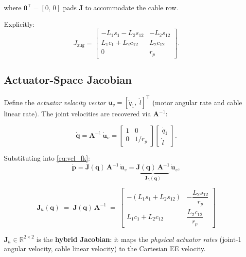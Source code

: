 \documentclass[12pt, a4paper]{article}
\theoremstyle{definition}
\newcommand{\bq}{\bm{q}}
\newcommand{\bp}{\bm{p}}
\newcommand{\bu}{\bm{u}}
\newcommand{\bJ}{\bm{J}}
\newcommand{\bA}{\bm{A}}
\newcommand{\cq}[1]{c_{#1}}   %
\newcommand{\sq}[1]{s_{#1}}   %
\newcommand{\cqq}[2]{c_{{#1}{#2}}}  %
\newcommand{\sqq}[2]{s_{{#1}{#2}}}  %
\begin{document}
where $\bm{0}^\top = [0,\,0]$ pads $\bJ$ to accommodate the cable row.

\noindent
Explicitly:
\begin{equation}
  \label{eq:Jaug_explicit}
  J_{\text{aug}} =
  \begin{bmatrix}
    -L_1 \sq{1} - L_2 \sqq{1}{2} & -L_2 \sqq{1}{2} \\[4pt]
     L_1 \cq{1} + L_2 \cqq{1}{2} &  L_2 \cqq{1}{2} \\[4pt]
     0 & r_p
  \end{bmatrix}.
\end{equation}

\subsection{Actuator-Space Jacobian}
\label{sec:act_jac}

Define the \emph{actuator velocity vector}
$\dot{\bu}_{v} = [\dot{q}_1,\; \dot{l}]^\top$ (motor angular rate and cable
linear rate).  The joint velocities are recovered via $\bA^{-1}$:

\begin{equation}
  \label{eq:q_from_uv}
  \dot{\bq}
  = \bA^{-1}\,\dot{\bu}_v
  =
  \begin{bmatrix}
    1 & 0 \\ 0 & 1/r_p
  \end{bmatrix}
  \begin{bmatrix}
    \dot{q}_1 \\ \dot{l}
  \end{bmatrix}.
\end{equation}

Substituting into \cref{eq:vel_fk}:
\begin{equation}
  \label{eq:hybrid_vel}
  \dot{\bp}
  = \bJ(\bq)\,\bA^{-1}\,\dot{\bu}_v
  = \underbrace{\bJ(\bq)\,\bA^{-1}}_{\bJ_h(\bq)}\,\dot{\bu}_v,
\end{equation}

\begin{equation}
  \label{eq:Jh}
  \boxed{
  \bJ_h(\bq)
  \;=\;
  \bJ(\bq)\,\bA^{-1}
  \;=\;
  \begin{bmatrix}
    -(L_1 \sq{1} + L_2 \sqq{1}{2}) & -\dfrac{L_2 \sqq{1}{2}}{r_p} \\[8pt]
     L_1 \cq{1} + L_2 \cqq{1}{2}  &  \dfrac{L_2 \cqq{1}{2}}{r_p}
  \end{bmatrix}
  }
\end{equation}

$\bJ_h \in \mathbb{R}^{2 \times 2}$ is the \textbf{hybrid Jacobian}: it maps the
\emph{physical actuator rates} (joint-1 angular velocity, cable linear velocity)
to the Cartesian EE velocity.
\end{document}
